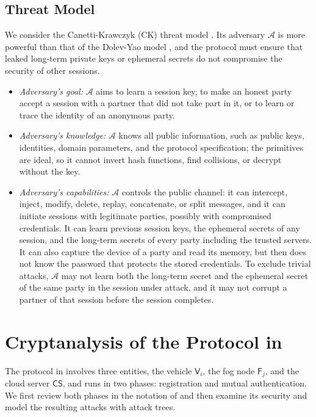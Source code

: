 \documentclass[journal]{IEEEtran}
\theoremstyle{plain}
\theoremstyle{definition}
\newcommand{\Veh}{\mathsf{V}}            %
\newcommand{\Fog}{\mathsf{F}}            %
\newcommand{\CS}{\mathsf{CS}}            %
\newcommand{\Adv}{\mathcal{A}}           %
\begin{document}
\subsection{Threat Model}\label{sec:threat}
We consider the Canetti-Krawczyk (CK) threat model \cite{canetti2001analysis}. Its adversary $\Adv$ is more powerful than that of the Dolev-Yao model \cite{dolev1983security}, and the protocol must ensure that leaked long-term private keys or ephemeral secrets do not compromise the security of other sessions.
\begin{itemize}
    \item \emph{Adversary's goal:} $\Adv$ aims to learn a session key, to make an honest party accept a session with a partner that did not take part in it, or to learn or trace the identity of an anonymous party.
    \item \emph{Adversary's knowledge:} $\Adv$ knows all public information, such as public keys, identities, domain parameters, and the protocol specification; the primitives are ideal, so it cannot invert hash functions, find collisions, or decrypt without the key.
    \item \emph{Adversary's capabilities:} $\Adv$ controls the public channel: it can intercept, inject, modify, delete, replay, concatenate, or split messages, and it can initiate sessions with legitimate parties, possibly with compromised credentials. It can learn previous session keys, the ephemeral secrets of any session, and the long-term secrets of every party including the trusted servers. It can also capture the device of a party and read its memory, but then does not know the password that protects the stored credentials. To exclude trivial attacks, $\Adv$ may not learn both the long-term secret and the ephemeral secret of the same party in the session under attack, and it may not corrupt a partner of that session before the session completes.
\end{itemize}

\section{Cryptanalysis of the Protocol in \texorpdfstring{\cite{chen2024provably}}{[11]}}\label{sec:crypt}
The protocol in \cite{chen2024provably} involves three entities, the vehicle $\Veh_i$, the fog node $\Fog_j$, and the cloud server $\CS$, and runs in two phases: registration and mutual authentication. We first review both phases in the notation of \cite{chen2024provably} and then examine its security and model the resulting attacks with attack trees.
\end{document}
